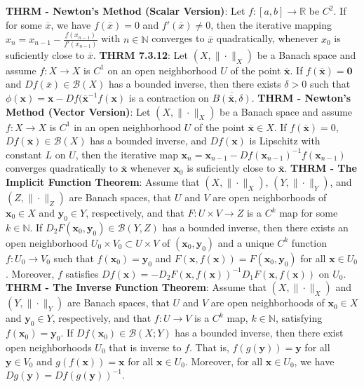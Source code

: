 \documentclass{article}
\theoremstyle{definition}
\begin{document}
\textbf{THRM - Newton's Method (Scalar Version)}: Let $f:[a,b] \rightarrow \mathbb{R}$ be $C^2$. If for some $\overline{x}$, we have $f(\overline{x}) = 0$ and $f'(\overline{x}) \neq 0$, then the iterative mapping $x_n = x_{n-1} -  \frac{f(x_{n-1})}{f'(x_{n-1})}$ with $n \in \mathbb{N}$ converges to $\overline{x}$ quadratically, whenever $x_0$ is suficiently close to $\overline{x}$.
\textbf{THRM 7.3.12}: Let $(X, \| \cdot \|_X )$ be a Banach space and assume $f: X \rightarrow X$ is $C^1$ on an open neighborhood $U$ of the point $\overline{\textbf{x}}$. If $f(\overline{\textbf{x}}) = \textbf{0}$ and $Df(\overline{x}) \in \mathscr{B}(X)$ has a bounded inverse, then there exists $\delta > 0$ such that $\phi(\textbf{x}) = \textbf{x} - Df(\overline{\textbf{x}}^{-1}f(\textbf{x})$ is a contraction on $\overline{B(\overline{\textbf{x}}, \delta)}$.
\textbf{THRM - Newton's Method (Vector Version)}: Let $(X, \| \cdot \|_X )$ be a Banach space and assume $f:X \rightarrow X$ is $C^1$ in an open neighborhood $U$ of the point $\overline{\textbf{x}} \in X$. If $f(\overline{\textbf{x}}) = 0$, $Df(\overline{\textbf{x}}) \in \mathscr{B}(X)$ has a bounded inverse, and $Df(\textbf{x})$ is Lipschitz with constant $L$ on $U$, then the iterative map $\textbf{x}_n = \textbf{x}_{n-1} - Df(\textbf{x}_{n-1})^{-1}f(\textbf{x}_{n-1})$ converges quadratically to $\overline{\textbf{x}}$ whenever $\textbf{x}_0$ is suficiently close to $\overline{\textbf{x}}$. \textbf{THRM - The Implicit Function Theorem}: Assume that $(X, \| \cdot \|_X )$, $(Y, \| \cdot \|_Y )$, and $(Z, \| \cdot \|_Z )$ are Banach spaces, that $U$ and $V$ are open neighborhoods of $\textbf{x}_0 \in X$ and $\textbf{y}_0 \in Y$, respectively, and that $F: U \times V \rightarrow Z$ is a $C^k$ map for some $k \in \mathbb{N}$. If $D_2F(\textbf{x}_0, \textbf{y}_0) \in \mathscr{B}(Y,Z)$ has a bounded inverse, then there exists an open neighborhood $U_0 \times V_0 \subset U\times V$ of $(\textbf{x}_0, \textbf{y}_0)$ and a unique $C^k$ function $f:U_0 \rightarrow V_0$ such that $f(\textbf{x}_0) = \textbf{y}_0$ and $F(\textbf{x}, f(\textbf{x})) = F(\textbf{x}_0, \textbf{y}_0)$ for all $\textbf{x} \in U_0$. Moreover, $f$ satisfies $Df(\textbf{x}) = -D_2F(\textbf{x}, f(\textbf{x}))^{-1}D_1F(\textbf{x}, f(\textbf{x}))$ on $U_0$.\\
\textbf{THRM - The Inverse Function Theorem}: Assume that  $(X, \| \cdot \|_X )$ and $(Y, \| \cdot \|_Y )$ are Banach spaces, that $U$ and $V$ are open neighborhoods of $\textbf{x}_0 \in X$ and $\textbf{y}_0 \in Y$, respectively, and that $f:U \rightarrow V$ is a $C^k$ map, $k \in \mathbb{N}$, satisfying $f(\textbf{x}_0) = \textbf{y}_0$. If $Df(\textbf{x}_0) \in \mathscr{B}(X;Y)$ has a bounded inverse, then there exist open neighborhoods $U_0$ that is inverse to $f$. That is, $f(g(\textbf{y})) = \textbf{y}$ for all $\textbf{y} \in V_0$ and $g(f(\textbf{x})) = \textbf{x}$ for all $\textbf{x} \in U_0$. Moreover, for all $\textbf{x} \in U_0$, we have $Dg(\textbf{y}) = Df(g(\textbf{y}))^{-1}$. \\ 
\end{document}
